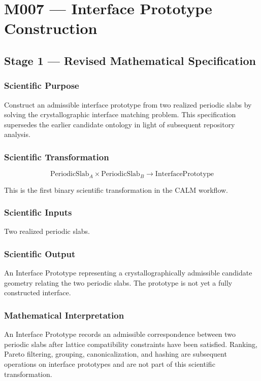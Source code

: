 \chapter{M007 --- Interface Prototype Construction}

\section{Stage 1 --- Revised Mathematical Specification}

\subsection{Scientific Purpose}

Construct an admissible interface prototype from two realized periodic slabs by
solving the crystallographic interface matching problem. This specification
supersedes the earlier candidate ontology in light of subsequent repository
analysis.

\subsection{Scientific Transformation}

\[
\mathrm{PeriodicSlab}_A \times \mathrm{PeriodicSlab}_B
\longrightarrow
\mathrm{InterfacePrototype}
\]

This is the first binary scientific transformation in the CALM workflow.

\subsection{Scientific Inputs}

Two realized periodic slabs.

\subsection{Scientific Output}

An Interface Prototype representing a crystallographically admissible candidate
geometry relating the two periodic slabs. The prototype is not yet a fully
constructed interface.

\subsection{Mathematical Interpretation}

An Interface Prototype records an admissible correspondence between two
periodic slabs after lattice compatibility constraints have been satisfied.
Ranking, Pareto filtering, grouping, canonicalization, and hashing are
subsequent operations on interface prototypes and are not part of this
scientific transformation.

